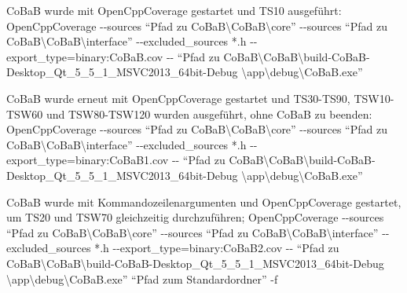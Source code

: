 CoBaB wurde mit OpenCppCoverage gestartet und TS10 ausgeführt:\smallskip\newline
OpenCppCoverage 
-\hspace{1pt}-sources \enquote{Pfad zu CoBaB\textbackslash CoBaB\textbackslash core} 
-\hspace{1pt}-sources \enquote{Pfad zu CoBaB\textbackslash CoBaB\textbackslash interface} 
-\hspace{1pt}-excluded\_sources *.h -\hspace{1pt}-export\_type=binary:CoBaB.cov 
-\hspace{1pt}- \newline \enquote{Pfad zu CoBaB\textbackslash CoBaB\textbackslash build-CoBaB-Desktop\_Qt\_5\_5\_1\_MSVC2013\_64bit-Debug  \textbackslash app\textbackslash debug\textbackslash CoBaB.exe}
\par

CoBaB wurde erneut mit OpenCppCoverage gestartet und TS30-TS90, TSW10-TSW60 und TSW80-TSW120 wurden ausgeführt, ohne CoBaB zu beenden: \smallskip\newline
OpenCppCoverage 
-\hspace{1pt}-sources \enquote{Pfad zu CoBaB\textbackslash CoBaB\textbackslash core} 
-\hspace{1pt}-sources \enquote{Pfad zu CoBaB\textbackslash CoBaB\textbackslash interface} 
-\hspace{1pt}-excluded\_sources *.h -\hspace{1pt}-export\_type=binary:CoBaB1.cov 
-\hspace{1pt}- \enquote{Pfad zu CoBaB\textbackslash CoBaB\textbackslash build-CoBaB-Desktop\_Qt\_5\_5\_1\_MSVC2013\_64bit-Debug \textbackslash app\textbackslash debug\textbackslash CoBaB.exe}
\par

CoBaB wurde mit Kommandozeilenargumenten und OpenCppCoverage gestartet, um TS20 und TSW70 gleichzeitig durchzuführen;\smallskip\newline
OpenCppCoverage 
-\hspace{1pt}-sources \enquote{Pfad zu CoBaB\textbackslash CoBaB\textbackslash core} 
-\hspace{1pt}-sources \enquote{Pfad zu CoBaB\textbackslash CoBaB\textbackslash interface} 
-\hspace{1pt}-excluded\_sources *.h -\hspace{1pt}-export\_type=binary:CoBaB2.cov 
-\hspace{1pt}- \enquote{Pfad zu CoBaB\textbackslash CoBaB\textbackslash build-CoBaB-Desktop\_Qt\_5\_5\_1\_MSVC2013\_64bit-Debug \textbackslash app\textbackslash debug\textbackslash CoBaB.exe} \enquote{Pfad zum Standardordner} -f
\par

